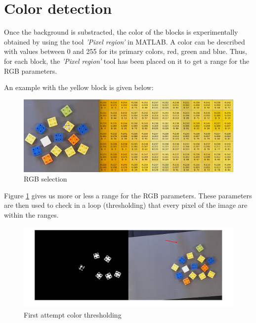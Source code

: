 \section{Color detection}

 	Once the background is substracted, the color of the blocks is experimentally obtained by using the tool \textit{'Pixel region'} in MATLAB. A color can be described with values between 0 and 255 for its primary colors, red, green and blue. Thus, for each block, the \textit{'Pixel region'} tool has been placed on it to get a range for the RGB parameters.\par

An example with the yellow block is given below:
\par

\begin{figure}[hb]
  \centering
  \includegraphics[scale=0.3]{figures/Thres_Y_manualy2.png}
  \caption[LABEL] {RGB selection}
  \label{fig:color1}
\end{figure}

Figure \ref{fig:color1} gives us more or less a range for the RGB parameters. These parameters are then used to check in a loop (thresholding) that every pixel of the image are within the ranges.\par

\begin{figure}[hb]
  \centering
  \includegraphics[scale=0.3]{figures/Thres_Y_bad2.png}
  \caption[LABEL] {First attempt color thresholding}
  \label{fig:color2}
\end{figure}
  

